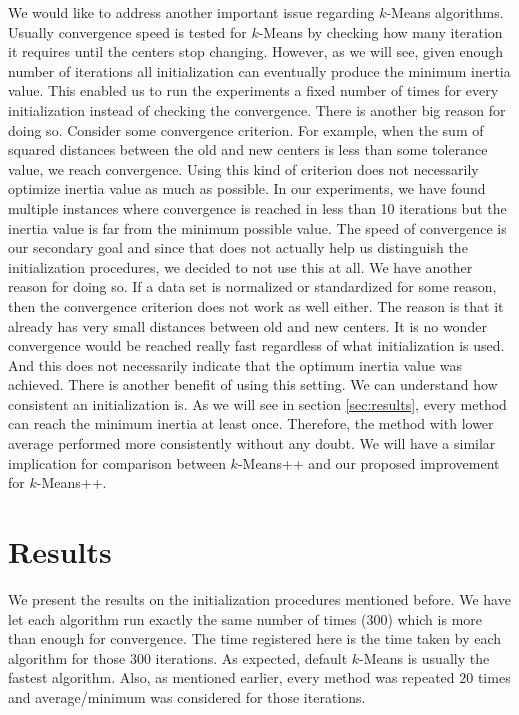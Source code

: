 \documentclass[twoside, 11pt]{article}
\begin{document}
	We would like to address another important issue regarding $k$-Means algorithms. Usually convergence speed is tested for $k$-Means by checking how many iteration it requires until the centers stop changing. However, as we will see, given enough number of iterations all initialization can eventually produce the minimum inertia value. This enabled us to run the experiments a fixed number of times for every initialization instead of checking the convergence. There is another big reason for doing so. Consider some convergence criterion. For example, when the sum of squared distances between the old and new centers is less than some tolerance value, we reach convergence. Using this kind of criterion does not necessarily optimize inertia value as much as possible. In our experiments, we have found multiple instances where convergence is reached in less than 10 iterations but the inertia value is far from the minimum possible value. The speed of convergence is our secondary goal and since that does not actually help us distinguish the initialization procedures, we decided to not use this at all. We have another reason for doing so. If a data set is normalized or standardized for some reason, then the convergence criterion does not work as well either. The reason is that it already has very small distances between old and new centers. It is no wonder convergence would be reached really fast regardless of what initialization is used. And this does not necessarily indicate that the optimum inertia value was achieved. There is another benefit of using this setting. We can understand how consistent an initialization is. As we will see in section \eqref{sec:results}, every method can reach the minimum inertia at least once. Therefore, the method with lower average performed more consistently without any doubt. We will have a similar implication for comparison between $k$-Means++ and our proposed improvement for $k$-Means++.
	\section{Results}\label{sec:results}
	We present the results on the initialization procedures mentioned before. We have let each algorithm run exactly the same number of times ($300$) which is more than enough for convergence. The time registered here is the time taken by each algorithm for those $300$ iterations. As expected, default $k$-Means is usually the fastest algorithm. Also, as mentioned earlier, every method was repeated $20$ times and average/minimum was considered for those iterations.
\end{document}
